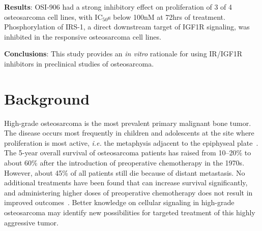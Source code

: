 \textbf{Results}: OSI-906 had a strong inhibitory effect on proliferation of 3 of 4 osteosarcoma cell lines, with IC$_{50}$s below 100nM at 72hrs of treatment. Phosphorylation of IRS-1, a direct downstream target of IGF1R signaling, was inhibited in the responsive osteosarcoma cell lines.

\textbf{Conclusions}: This study provides an {\it in vitro} rationale for using IR/IGF1R inhibitors in preclinical studies of osteosarcoma.

\section{Background}\label{introduction5}
High-grade osteosarcoma is the most prevalent primary malignant bone tumor. The disease occurs most frequently in children and adolescents at the site where proliferation is most active, {\it i.e.} the metaphysis adjacent to the epiphyseal plate~\cite{raymond2002conventional}. The 5-year overall survival of osteosarcoma patients has raised from 10--20\% to about 60\% after the introduction of preoperative chemotherapy in the 1970s. However, about 45\% of all patients still die because of distant metastasis. No additional treatments have been found that can increase survival significantly, and administering higher doses of preoperative chemotherapy does not result in improved outcomes~\cite{lewis2007improvement,eselgrim2006dose}. Better knowledge on cellular signaling in high\hyp{}grade osteosarcoma may identify new possibilities for targeted treatment of this highly aggressive tumor.

